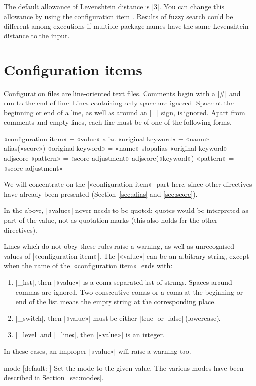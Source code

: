 \documentclass{texdoc-doc}
\begin{document}
The default allowance of Levenshtein distance is |3|. You can change this
allowance by using the configuration item . Results of fuzzy
search could be different among executions if multiple package names have the
same Levenshtein distance to the input.

\section{Configuration items}
\label{sec:conf}

Configuration files are line-oriented text files. Comments begin with a |#|
and run to the end of line. Lines containing only space are ignored. Space at
the beginning or end of a line, as well as around an |=| sign, is ignored.
Apart from comments and empty lines, each line must be of one of the following
forms.
%
\begin{htcode}
«configuration item» = «value»
alias «original keyword» = «name»
alias(«score») «original keyword» = «name»
stopalias «original keyword»
adjscore «pattern» = «score adjustment»
adjscore(«keyword») «pattern» = «score adjustment»
\end{htcode}

We will concentrate on the |«configuration item»| part here, since other
directives have already been presented (Section~\ref{sec:alias} and
\ref{sec:score}).

In the above, |«value»|  never needs to be quoted: quotes would be interpreted
as part of the value, not as quotation marks (this also holds for the other
directives).

Lines which do not obey these rules raise a warning, as well as unrecognised
values of |«configuration item»|. The |«value»| can be an arbitrary string,
except when the name of the |«configuration item»| ends with:
%
\begin{enumerate}
\item |_list|, then |«value»| is a coma-separated list of strings. Spaces
  around commas are ignored. Two consecutive comas or a coma at the beginning
  or end of the list means the empty string at the corresponding place.
\item |_switch|, then |«value»| must be either |true| or |false|
  (lowercase).
\item |_level| and |_lines|, then |«value»| is an integer.
\end{enumerate}
%
In these cases, an improper |«value»| will raise a warning too.

\begin{confitem}{mode}
  {}[default: ]
Set the  mode to the given value. The various modes have been described
in Section~\ref{sec:modes}.
\end{confitem}
\end{document}
